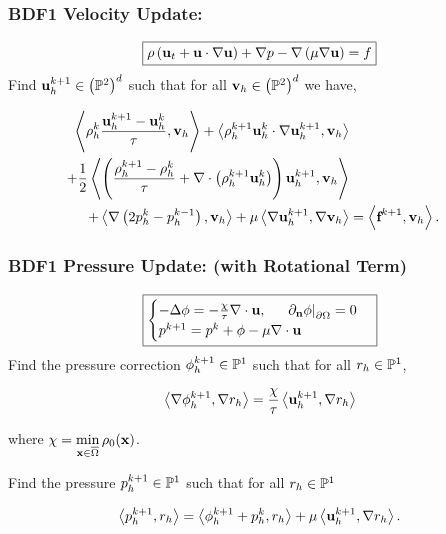 \documentclass{beamer}
\begin{document}
 \begin{frame}
   \frametitle{BDF1 Velocity Update:}
    \begin{equation*}\boxed{
      \rho\left(\textbf{u}_t + \textbf{u}\cdot\nabla\textbf{u}\right) + \nabla p - \nabla\left(\mu \nabla\textbf{u}\right) = f}
    \end{equation*}
    \vfill
    Find $\textbf{u}^{k+1}_h\in\left(\mathbb{P}^2\right)^d$ such that for all $\textbf{v}_h \in \left(\mathbb{P}^2\right)^d$ we have,
    \begin{block}{}
    \begin{equation*}
      \begin{split}
        \left\langle \rho_h^{k} \frac{\textbf{u}_h^{k+1}-\textbf{u}_h^{k} }{\tau} , \textbf{v}_h \right\rangle + \left\langle  \rho_h^{k+1}\textbf{u}_h^{k}\cdot\nabla\textbf{u}_h^{k+1} , \textbf{v}_h \right\rangle \\
         + \frac{1}{2}\left\langle  \left(\frac{\rho_h^{k+1} - \rho_h^{k}}{\tau} + \nabla\cdot\left(\rho_h^{k+1}\textbf{u}_h^{k}\right)  \right )\textbf{u}_h^{k+1} , \textbf{v}_h \right\rangle &\\
         +\left\langle \nabla \left(2p_h^{k} - p_h^{k-1}\right), \textbf{v}_h \right\rangle+ \mu\left\langle  \nabla \textbf{u}_h^{k+1} , \nabla\textbf{v}_h \right\rangle &= \left\langle \textbf{f}^{k+1}, \textbf{v}_h \right\rangle.
      \end{split}
    \end{equation*}
    \end{block}
  \end{frame}
  
  \begin{frame}
    \frametitle{BDF1 Pressure Update: (with Rotational Term)}
    \begin{equation*}\boxed{
      \begin{cases}
      -\Delta \phi = -\frac{\chi}{\tau}\nabla\cdot\textbf{u},\hspace{0.5cm} \left.\partial_{\textbf{n}}\phi\right|_{\partial\Omega} = 0\\
      p^{k+1} = p^{k} + \phi - \mu\nabla\cdot\textbf{u}
      \end{cases}}
    \end{equation*}
    \vfill
    Find the pressure correction $\phi_h^{k+1}\in \mathbb{P}^1$ such that for all $r_h\in \mathbb{P}^1$,
    \begin{block}{}
    \begin{equation*}
      \left\langle \nabla\phi_h^{k+1}, \nabla r_h \right\rangle = \frac{\chi}{\tau}\left\langle \textbf{u}_h^{k+1}, \nabla r_h \right\rangle
    \end{equation*}
    \end{block}
    where $\chi = \displaystyle\min_{\textbf{x}\in\overline{\Omega}}\rho_0(\textbf{x})$.\newline

    Find the pressure $p_h^{k+1}\in \mathbb{P}^1$ such that for all $r_h\in \mathbb{P}^1$
    \begin{block}{}
    \begin{equation*}
      \left\langle p_h^{k+1}, r_h \right\rangle = \left\langle \phi_h^{k+1} + p_h^{k}, r_h \right\rangle + \mu\left\langle \textbf{u}_h^{k+1}, \nabla r_h \right\rangle.
    \end{equation*}
    \end{block}
  \end{frame}
\end{document}
